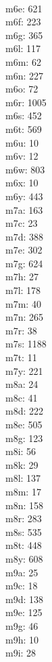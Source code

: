 \begin{multicols}{8}
  \\ m6e: 621
  \\ m6f: 223
  \\ m6g: 365
  \\ m6l: 117
  \\ m6m: 62
  \\ m6n: 227
  \\ m6o: 72
  \\ m6r: 1005
  \\ m6s: 452
  \\ m6t: 569
  \\ m6u: 10
  \\ m6v: 12
  \\ m6w: 803
  \\ m6x: 10
  \\ m6y: 443
  \\ m7a: 163
  \\ m7c: 23
  \\ m7d: 388
  \\ m7e: 302
  \\ m7g: 624
  \\ m7h: 27
  \\ m7l: 178
  \\ m7m: 40
  \\ m7n: 265
  \\ m7r: 38
  \\ m7s: 1188
  \\ m7t: 11
  \\ m7y: 221
  \\ m8a: 24
  \\ m8c: 41
  \\ m8d: 222
  \\ m8e: 505
  \\ m8g: 123
  \\ m8i: 56
  \\ m8k: 29
  \\ m8l: 137
  \\ m8m: 17
  \\ m8n: 158
  \\ m8r: 283
  \\ m8s: 535
  \\ m8t: 448
  \\ m8y: 608
  \\ m9a: 25
  \\ m9c: 18
  \\ m9d: 138
  \\ m9e: 125
  \\ m9g: 46
  \\ m9h: 10
  \\ m9i: 28

\end{multicols}
